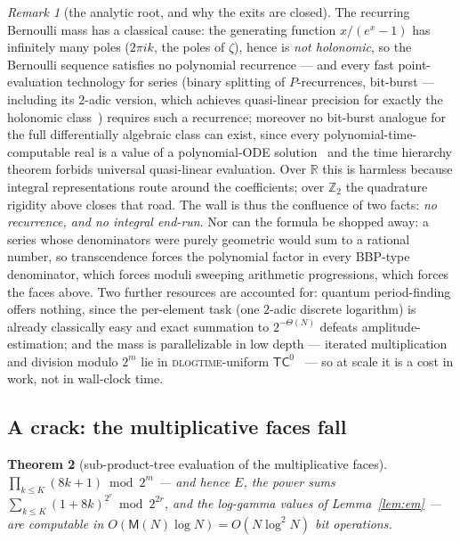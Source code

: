 \documentclass[11pt]{article}
\newtheorem{theorem}{Theorem}
\theoremstyle{remark}
\newtheorem{remark}[theorem]{Remark}
\theoremstyle{definition}
\newcommand{\M}{\mathsf{M}}
\newcommand{\Z}{\mathbb{Z}}
\begin{document}
\begin{remark}[the analytic root, and why the exits are closed]
\label{rem:root}
The recurring Bernoulli mass has a classical cause: the generating
function $x/(e^{x}-1)$ has infinitely many poles ($2\pi ik$, the poles of
$\zeta$), hence is \emph{not holonomic}, so the Bernoulli sequence
satisfies no polynomial recurrence --- and every fast point-evaluation
technology for series (binary splitting of $P$-recurrences, bit-burst
--- including its $2$-adic version, which achieves quasi-linear precision
for exactly the holonomic class~\cite{CMTV21}) requires such a
recurrence; moreover no bit-burst analogue for the full differentially
algebraic class can exist, since every polynomial-time-computable real is
a value of a polynomial-ODE solution~\cite{BGP17} and the time hierarchy
theorem forbids universal quasi-linear evaluation. Over $\mathbb{R}$ this is harmless
because integral representations route around the coefficients; over
$\Z_2$ the quadrature rigidity above closes that road. The wall is thus
the confluence of two facts: \emph{no recurrence, and no integral
end-run}. Nor can the formula be shopped away: a series whose
denominators were purely geometric would sum to a rational number, so
transcendence forces the polynomial factor in every BBP-type
denominator, which forces moduli sweeping arithmetic progressions, which
forces the faces above. Two further resources are accounted for: quantum
period-finding offers nothing, since the per-element task (one $2$-adic
discrete logarithm) is already classically easy and exact summation to
$2^{-\Theta(N)}$ defeats amplitude-estimation; and the mass is
parallelizable in low depth --- iterated multiplication and division modulo
$2^{m}$ lie in \textsc{dlogtime}-uniform $\mathsf{TC}^{0}$~\cite{HAB02} --- so
at scale it is a cost in work, not in wall-clock time.
\end{remark}

\subsection{A crack: the multiplicative faces fall}

\begin{theorem}[sub-product-tree evaluation of the multiplicative faces]
\label{thm:crack}
$\prod_{k\le K}(8k+1)\bmod 2^{m}$ --- and hence $E$, the power sums
$\sum_{k\le K}(1+8k)^{2^{r}}\bmod 2^{2r}$, and the log-gamma values of
Lemma~\ref{lem:em} --- are computable in
$O(\M(N)\log N)=O(N\log^{2}N)$ bit operations.
\end{theorem}
\end{document}
